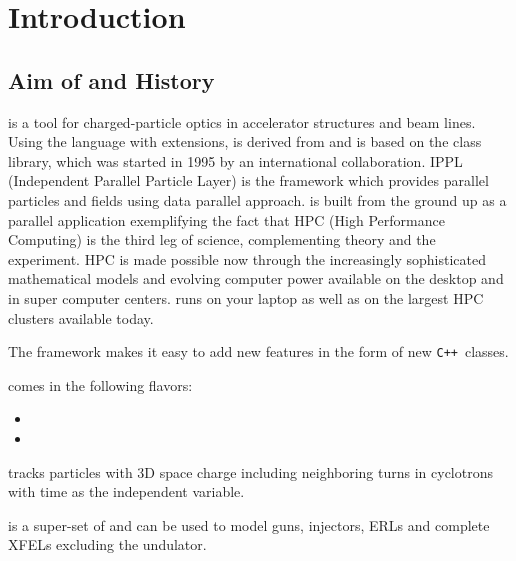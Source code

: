 


\chapter{Introduction}\label{chp:Introduction}

\section{Aim of \opal and History}
\opal is a tool for charged-particle optics in
accelerator structures and beam lines.
Using the \mad language with extensions, \opal is derived from \madninep and is based
on the \classic \cite{bib:classic} class library, which was started in 1995 by an international
collaboration.  IPPL (Independent Parallel Particle Layer) is
the framework which provides parallel particles and fields using data parallel approach.
\opal is built from the ground up as a parallel application exemplifying the fact that HPC (High Performance Computing)
is the third leg of science, complementing theory and the experiment.
HPC is made possible now through the increasingly sophisticated mathematical models and evolving computer power available on the desktop
and in super computer centers. \opal runs on your laptop as well as on the largest HPC clusters available today.

The \opal framework makes it easy to add new features in the form of new
\texttt{C++}~classes.

\opal comes in the following flavors:
\begin{itemize}
\item \opalcycl
\item \opalt
{}
\end{itemize}


\opalcycl tracks particles with 3D space charge including neighboring turns in cyclotrons
with time as the independent variable.

\opalt is a super-set of \impactt \cite{qiang2005} and can be used to model guns, injectors, ERLs and complete XFELs excluding the undulator.

